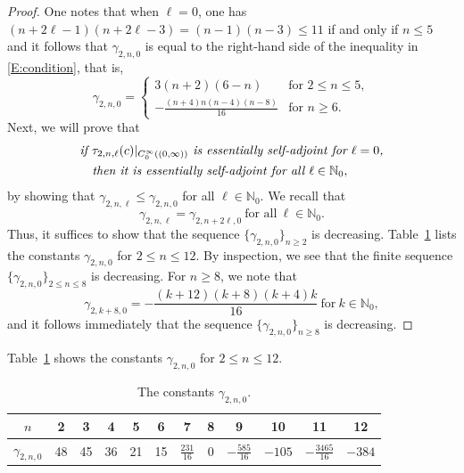 \documentclass[reqno,11pt,centertags]{amsart}
\newcommand{\bbN}{{\mathbb{N}}}
\newcommand{\<}{\langle}
\renewcommand{\>}{\rangle}
\newcommand{\lb}{\label}
\numberwithin{equation}{section}
\theoremstyle{definition}
\def\d{\displaystyle}
\begin{document}
\begin{proof}
One notes that  when  $\ell=0$, one has $(n+2\ell-1)(n+2\ell-3)=(n-1)(n-3)\leq 11$ if and only if $n\leq 5$
and it follows that  $\gamma_{2,n,0}$ is equal to the right-hand side of the inequality in \eqref{E:condition}, that is, 
\begin{equation}
\gamma_{2,n,0} = \begin{cases}
3(n+2)(6-n) & \mbox{for $2\leq n\leq 5$},   \\[10pt]
{\displaystyle -\frac{(n+4)n(n-4)(n-8)}{16}}& \mbox{for $n\geq 6$}.    
\end{cases}
\end{equation} 
Next, we will prove that 
\begin{align}\lb{L:ell=0 implies}
\begin{split} 
& \text{\it if  $\tau_{2,n,\ell}(c)|_{C_0^{\infty}((0,\infty))}$ is essentially self-adjoint for $\ell=0$,} \\
&  \quad \text{\it  then it is  essentially self-adjoint for all $\ell\in \bbN_0$},    \\
\end{split} 
\end{align}
by showing that $\gamma_{2,n,\ell}\leq \gamma_{2,n,0}$ for all $\ell\in \bbN_0$. We recall that 
\begin{equation}
 \gamma_{2,n,\ell}= \gamma_{2,n+2\ell,0} \ \mbox{for all}\ \ell \in \bbN_0.
\end{equation} 
Thus, it suffices to show that the sequence $\{\gamma_{2,n,0}\}_{n \ge 2}$ is decreasing.
Table~\ref{T: gamma_2,n,0} lists the constants $\gamma_{2,n,0}$ for $2 \le n \le 12$. 
By inspection, we see that the finite sequence $\{\gamma_{2,n,0}\}_{2 \le n \le 8}$ is decreasing. 
For $n \ge 8$, we note that 
\begin{equation}
\gamma_{2,k+8,0} = -\frac{(k+12)(k+8)(k+4)k}{16}  \ \mbox{for}\ k \in \bbN_0,
\end{equation}
and it follows immediately that the sequence $\{\gamma_{2,n,0}\}_{n \ge 8}$ is decreasing. 
\end{proof}

Table~\ref{T: gamma_2,n,0} shows the constants $\gamma_{2,n,0}$ for $2\leq n\leq 12$.
 
 \begin{table}[H]
 \begin{tabular}{c|ccccccccccc}
 $n$ & 2 &3 &4 &5&6& 7& 8& 9& 10& 11& 12\\[2pt]
\hline
\rule{0pt}{4ex}
$\gamma_{2,n,0}$ & 48&45&36&21&15&$\d\frac{231}{16}$&0&$\d-\frac{585}{16}$&$-105$&$\d-\frac{3465}{16}$&$-384$\\
\end{tabular}
\caption{The constants $\gamma_{2,n,0}$.}
\lb{T: gamma_2,n,0} 
\end{table}
\end{document}
